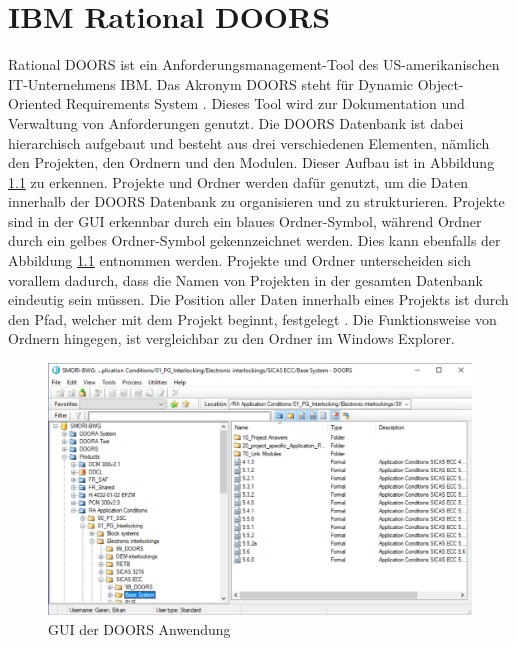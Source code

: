 \chapter{IBM Rational DOORS}
\label{chap:kapitel3}

Rational DOORS ist ein Anforderungsmanagement-Tool des US-amerikanischen IT-Unternehmens IBM. Das Akronym \acs{DOORS} steht für Dynamic Object-Oriented Requirements System \cite[]{q5}.
Dieses Tool wird zur Dokumentation und Verwaltung von Anforderungen genutzt. Die \acs{DOORS} Datenbank ist dabei hierarchisch aufgebaut und besteht aus drei verschiedenen Elementen, nämlich den 
Projekten, den Ordnern und den Modulen. Dieser Aufbau ist in Abbildung \ref*{fig:Doors GUI} zu erkennen. Projekte und Ordner werden dafür genutzt, um die Daten innerhalb der \acs{DOORS} Datenbank 
zu organisieren und zu strukturieren. Projekte sind in der GUI erkennbar durch ein blaues Ordner-Symbol, während Ordner durch ein gelbes Ordner-Symbol gekennzeichnet werden. Dies kann ebenfalls der 
Abbildung \ref*{fig:Doors GUI} entnommen werden. Projekte und Ordner unterscheiden sich vorallem dadurch, dass die Namen von Projekten in der gesamten Datenbank eindeutig sein müssen. 
Die Position aller Daten innerhalb eines Projekts ist durch den Pfad, welcher mit dem Projekt beginnt, festgelegt \cite[]{q6}. Die Funktionsweise von Ordnern hingegen, ist vergleichbar 
zu den Ordner im Windows Explorer.     

\begin{figure}[H]
    \centering
    \includegraphics[width = \textwidth]{abbildungen/IBM Doors.PNG}
    \caption{GUI der \acs{DOORS} Anwendung}
    \label{fig:Doors GUI}
\end{figure}

